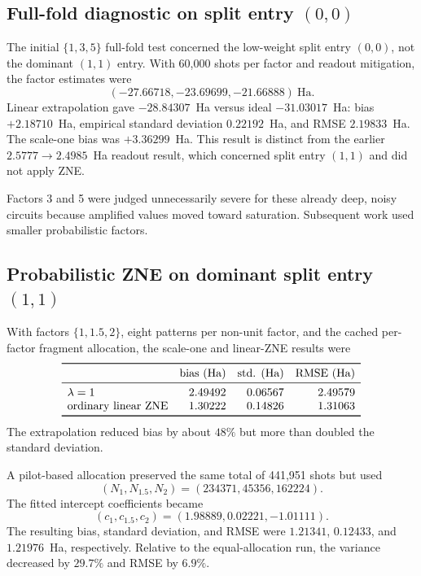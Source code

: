 \documentclass[11pt]{article}
\begin{document}
\subsection{Full-fold diagnostic on split entry
\texorpdfstring{$(0,0)$}{(0,0)}}

The initial $\{1,3,5\}$ full-fold test concerned the low-weight split entry
$(0,0)$, not the dominant $(1,1)$ entry.  With 60,000 shots per factor and
readout mitigation, the factor estimates were
\[
 (-27.66718,-23.69699,-21.66888)\ \mathrm{Ha}.
\]
Linear extrapolation gave $-28.84307$~Ha versus ideal $-31.03017$~Ha:
bias $+2.18710$~Ha, empirical standard deviation $0.22192$~Ha, and RMSE
$2.19833$~Ha.  The scale-one bias was $+3.36299$~Ha.  This result is distinct
from the earlier $2.5777\rightarrow2.4985$~Ha readout result, which concerned
split entry $(1,1)$ and did not apply ZNE.

Factors 3 and 5 were judged unnecessarily severe for these already deep,
noisy circuits because amplified values moved toward saturation.  Subsequent
work used smaller probabilistic factors.

\subsection{Probabilistic ZNE on dominant split entry
\texorpdfstring{$(1,1)$}{(1,1)}}

With factors $\{1,1.5,2\}$, eight patterns per non-unit factor, and the cached
per-factor fragment allocation, the scale-one and linear-ZNE results were
\[
\begin{array}{lrrr}
\toprule
 & \text{bias (Ha)} & \text{std. (Ha)} & \text{RMSE (Ha)}\\
\midrule
\lambda=1 & 2.49492 & 0.06567 & 2.49579\\
\text{ordinary linear ZNE} & 1.30222 & 0.14826 & 1.31063\\
\bottomrule
\end{array}
\]
The extrapolation reduced bias by about $48\%$ but more than doubled the
standard deviation.

A pilot-based allocation preserved the same total of 441,951 shots but used
\[
 (N_1,N_{1.5},N_2)=(234371,45356,162224).
\]
The fitted intercept coefficients became
\[
 (c_1,c_{1.5},c_2)=(1.98889,0.02221,-1.01111).
\]
The resulting bias, standard deviation, and RMSE were $1.21341$, $0.12433$,
and $1.21976$~Ha, respectively.  Relative to the equal-allocation run, the
variance decreased by $29.7\%$ and RMSE by $6.9\%$.
\end{document}
